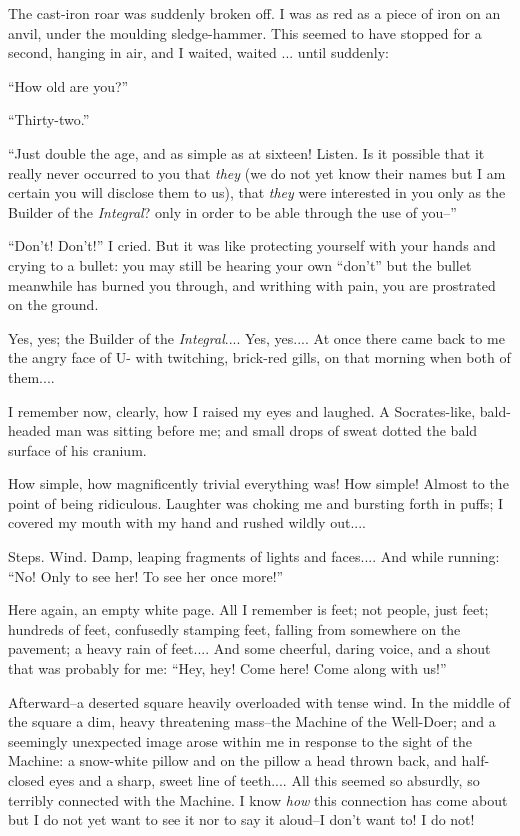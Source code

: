 \documentclass[11pt,openany]{book}
\begin{document}
The cast-iron roar was suddenly broken off. I was as red as a piece of iron on an anvil, under the moulding sledge-hammer. This seemed to have stopped for a second, hanging in air, and I waited, waited ... until suddenly:

``How old are you?''

``Thirty-two.''

``Just double the age, and as simple as at sixteen! Listen. Is it possible that it really never occurred to you that \emph{they} (we do not yet know their names but I am certain you will disclose them to us), that \emph{they} were interested in you only as the Builder of the \emph{Integral}? only in order to be able through the use of you--''

``Don't! Don't!'' I cried. But it was like protecting yourself with your hands and crying to a bullet: you may still be hearing your own ``don't'' but the bullet meanwhile has burned you through, and writhing with pain, you are prostrated on the ground.

Yes, yes; the Builder of the \emph{Integral}.... Yes, yes.... At once there came back to me the angry face of U- with twitching, brick-red gills, on that morning when both of them....

I remember now, clearly, how I raised my eyes and laughed. A Socrates-like, bald-headed man was sitting before me; and small drops of sweat dotted the bald surface of his cranium.

How simple, how magnificently trivial everything was! How simple! Almost to the point of being ridiculous. Laughter was choking me and bursting forth in puffs; I covered my mouth with my hand and rushed wildly out....

Steps. Wind. Damp, leaping fragments of lights and faces.... And while running: ``No! Only to see her! To see her once more!''

Here again, an empty white page. All I remember is feet; not people, just feet; hundreds of feet, confusedly stamping feet, falling from somewhere on the pavement; a heavy rain of feet.... And some cheerful, daring voice, and a shout that was probably for me: ``Hey, hey! Come here! Come along with us!''

Afterward--a deserted square heavily overloaded with tense wind. In the middle of the square a dim, heavy threatening mass--the Machine of the Well-Doer; and a seemingly unexpected image arose within me in response to the sight of the Machine: a snow-white pillow and on the pillow a head thrown back, and half-closed eyes and a sharp, sweet line of teeth.... All this seemed so absurdly, so terribly connected with the Machine. I know \emph{how} this connection has come about but I do not yet want to see it nor to say it aloud--I don't want to! I do not!
\end{document}
